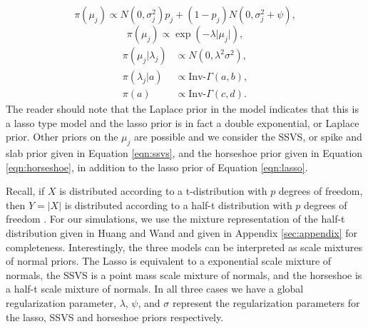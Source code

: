 \begin{equation}\label{eqn:ssvs}
\pi(\mu_j) \propto N(0,\sigma_j^2)p_j+(1-p_j)N(0,\sigma_j^2+\psi),
\end{equation}
\begin{equation}\label{eqn:lasso}
\pi(\mu_j) \propto \exp(-\lambda\vert \mu_j\vert),
\end{equation}
\begin{align}\label{eqn:horseshoe}
\pi(\mu_j\vert \lambda_j) &\propto N(0, \lambda^2\sigma^2),\\
\pi(\lambda_j | a)&\propto \text{Inv-}\Gamma(a,b),\nonumber \\ \nonumber
\pi(a)&\propto \text{Inv-}\Gamma(c,d).
\end{align}
The reader should note that the Laplace prior in the model indicates that this is a lasso type model and the lasso prior is in fact a double exponential, or Laplace prior. Other priors on the $\mu_j$ are possible and we consider the SSVS, or spike and slab prior given in Equation \ref{eqn:ssvs}, and the horseshoe prior given in Equation \ref{eqn:horseshoe}, in addition to the lasso prior of Equation \ref{eqn:lasso}. 

Recall, if $X$ is distributed according to a t-distribution with $p$ degrees of freedom, then $Y=\vert X\vert$ is distributed according to a half-t distribution with $p$ degrees of freedom \cite{johnson1995continuous}. For our simulations, we use the mixture representation of the half-t distribution given in Huang and Wand \cite{huang2013simple} and given in Appendix \ref{sec:appendix} for completeness. Interestingly, the three models can be interpreted as scale mixtures of normal priors. The Lasso is equivalent to a exponential scale mixture of normals, the SSVS is a point mass scale mixture of normals, and the horseshoe is a half-t scale mixture of normals. In all three cases we have a global regularization parameter, $\lambda$, $\psi$, and $\sigma$ represent the regularization parameters for the lasso, SSVS and horseshoe priors respectively.    
